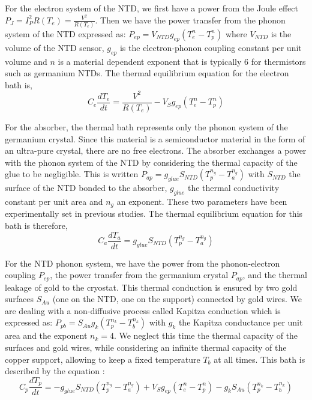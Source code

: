 For the electron system of the NTD, we first have a power from the Joule effect $P_J= I_P^2 R(T_e)=\frac{V^2}{R(T_e)}$. Then we have the power transfer from the phonon system of the NTD expressed as: $P_{ep}=V_{NTD} g_{ep} (T_e^n - T_p^n)$ where $V_{NTD}$ is the volume of the NTD sensor, $g_{ep}$ is the electron-phonon coupling constant per unit volume and $n$ is a material dependent exponent that is typically 6 for thermistors such as germanium NTDs. The thermal equilibrium equation for the electron bath is,
\begin{equation}
\label{electron}
 C_e \frac{d T_e}{d t} = \frac{V^2}{R(T_e)} - V_S g_{ep} \left( T_e^{n} - T_p^{n} \right)
\end{equation}

For the absorber, the thermal bath represents only the phonon system of the germanium crystal. Since this material is a semiconductor material in the form of an ultra-pure crystal, there are no free electrons. The absorber exchanges a power with the phonon system of the NTD by considering the thermal capacity of the glue to be negligible. This is written $P_{ap}=g_{glue} S_{NTD} \left( T_p^{n_g} - T_a^{n_g} \right)$ with $S_{NTD}$ the surface of the NTD bonded to the absorber, $g_{glue}$ the thermal conductivity constant per unit area and $n_g$ an exponent. These two parameters have been experimentally set in previous studies. The thermal equilibrium equation for this bath is therefore,
\begin{equation}
\label{absorbeur}
C_a \frac{d T_a}{d t} = g_{glue} S_{NTD} \left( T_p^{n_g} - T_a^{n_g} \right)
\end{equation}


For the NTD phonon system, we have the power from the phonon-electron coupling $P_{ep}$, the power transfer from the germanium crystal $P_{ap}$, and the thermal leakage of gold to the cryostat. This thermal conduction is ensured by two gold surfaces $S_{Au}$ (one on the NTD, one on the support) connected by gold wires. We are dealing with a non-diffusive process called Kapitza conduction which is expressed as: $P_{pb}=S_{Au} g_k (T_p^{n_k} - T_b^{n_k})$ with $g_k$ the Kapitza conductance per unit area and the exponent $n_k=4$. We neglect this time the thermal capacity of the surfaces and gold wires, while considering an infinite thermal capacity of the copper support, allowing to keep a fixed temperature $T_b$ at all times.
This bath is described by the equation :
\begin{equation}
\label{phonon}
C_p \frac{d T_p}{d t} = -g_{glue} S_{NTD} \left( T_p^{n_g} - T_a^{n_g} \right)  + V_S g_{ep} \left( T_e^{n} - T_p^{n} \right) - g_k S_{Au} \left( T_p^{n_k} - T_b^{n_k} \right)
\end{equation}

